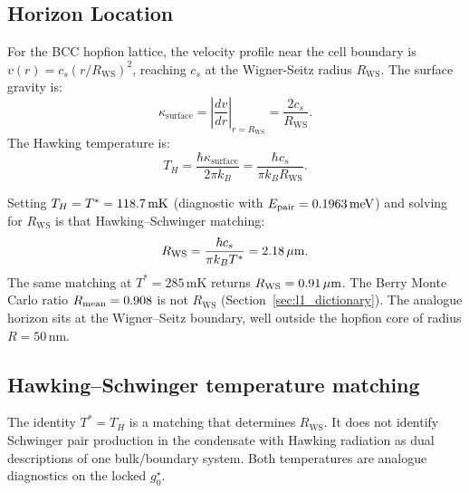 \documentclass[11pt,letterpaper]{article}
\begin{document}
\subsection{Horizon Location}

For the BCC hopfion lattice, the velocity profile near the cell boundary is $v(r) = c_s (r/R_{\text{WS}})^2$, reaching $c_s$ at the Wigner-Seitz radius $R_{\text{WS}}$. The surface gravity is:
\begin{equation}
\kappa_{\text{surface}} = \left|\frac{dv}{dr}\right|_{r=R_{\text{WS}}} = \frac{2c_s}{R_{\text{WS}}}.
\end{equation}
The Hawking temperature is:
\begin{equation}
T_H = \frac{\hbar \kappa_{\text{surface}}}{2\pi k_B} = \frac{\hbar c_s}{\pi k_B R_{\text{WS}}}.
\end{equation}

Setting $T_H = T^*=118.7\,\mathrm{mK}$ (diagnostic with $E_{\mathrm{pair}}=0.1963\,\mathrm{meV}$) and solving for $R_{\mathrm{WS}}$ is that Hawking--Schwinger matching:
\begin{equation}
R_{\text{WS}} = \frac{\hbar c_s}{\pi k_B T^*} =2.18\,\mu\mathrm{m}.
\label{eq:Rws_hawking}
\end{equation}
The same matching at $T^*=285$\,mK returns $R_{\mathrm{WS}}=0.91\,\mu\mathrm{m}$. The Berry Monte Carlo ratio $R_{\mathrm{mean}}=0.908$ is not $R_{\mathrm{WS}}$ (Section~\ref{sec:l1_dictionary}). The analogue horizon sits at the Wigner--Seitz boundary, well outside the hopfion core of radius $R=50$\,nm.

\subsection{Hawking--Schwinger temperature matching}

The identity $T^* = T_H$ is a matching that determines $R_{\mathrm{WS}}$. It does not identify Schwinger pair production in the condensate with Hawking radiation as dual descriptions of one bulk/boundary system. Both temperatures are analogue diagnostics on the locked $g_0^\star$.
\end{document}

